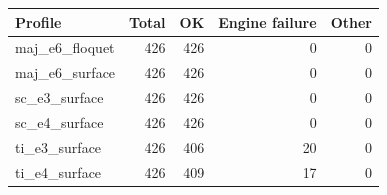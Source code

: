 \begin{tabular}{lrrrr}
\toprule
Profile & Total & OK & Engine failure & Other \\
\midrule
maj\_e6\_floquet & 426 & 426 & 0 & 0 \\
maj\_e6\_surface & 426 & 426 & 0 & 0 \\
sc\_e3\_surface & 426 & 426 & 0 & 0 \\
sc\_e4\_surface & 426 & 426 & 0 & 0 \\
ti\_e3\_surface & 426 & 406 & 20 & 0 \\
ti\_e4\_surface & 426 & 409 & 17 & 0 \\
\bottomrule
\end{tabular}

